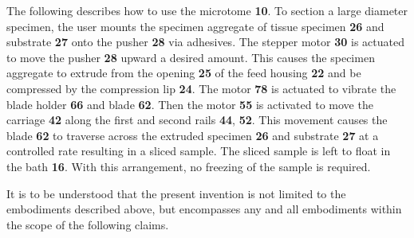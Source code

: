 \documentclass{article}
\begin{document}
The following describes how to use the microtome \textbf{10}. To section a large diameter specimen, the user mounts the specimen aggregate of tissue specimen \textbf{26} and substrate \textbf{27} onto the pusher \textbf{28} via adhesives. The stepper motor \textbf{30} is actuated to move the pusher \textbf{28} upward a desired amount. This causes the specimen aggregate to extrude from the opening \textbf{25} of the feed housing \textbf{22} and be compressed by the compression lip \textbf{24}. The motor \textbf{78} is actuated to vibrate the blade holder \textbf{66} and blade \textbf{62}. Then the motor \textbf{55} is activated to move the carriage \textbf{42} along the first and second rails \textbf{44}, \textbf{52}. This movement causes the blade \textbf{62} to traverse across the extruded specimen \textbf{26} and substrate \textbf{27} at a controlled rate resulting in a sliced sample. The sliced sample is left to float in the bath \textbf{16}. With this arrangement, no freezing of the sample is required.

It is to be understood that the present invention is not limited to the embodiments described above, but encompasses any and all embodiments within the scope of the following claims.
\end{document}
